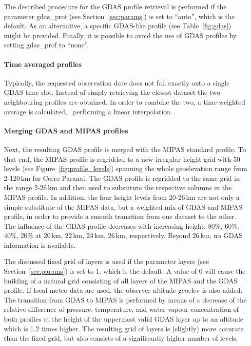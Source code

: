 The described procedure for the \ac{GDAS} profile retrieval is performed if
the parameter {\sc gdas\_prof} (see Section~\ref{sec:params}) is set to
``auto'', which is the default. As an alternative, a specific GDAS-like
profile (see Table~\ref{fig:gdas}) might be provided. Finally, it is possible
to avoid the use of GDAS profiles by setting {\sc gdas\_prof} to ``none''.

\paragraph*{Time averaged profiles}
\label{sec:time_average}
Typically, the requested observation date does not fall exactly onto a single
\ac{GDAS} time slot. Instead of simply retrieving the closest dataset the two
neighbouring profiles are obtained. In order to combine the two, a
time-weighted average is calculated, \ie\ performing a linear interpolation.

\paragraph*{Merging GDAS and MIPAS profiles}
\label{sec:gdas_mipas_merging}
Next, the resulting \ac{GDAS} profile is merged with the MIPAS standard
profile. To that end, the MIPAS profile is regridded to a new irregular height
grid with 50 levels (see Figure~\ref{fig:profile_levels}) spanning the whole
geoelevation range from 2-120\,km for Cerro Paranal. The \ac{GDAS} profile is
regridded to the same grid in the range 2-26\,km and then used to substitute
the respective columns in the MIPAS profile. In addition, the four height
levels from 20-26\,km are not only a simple substitute of the MIPAS data, but a
weighted mix of \ac{GDAS} and MIPAS profile, in order to provide a smooth
transition from one dataset to the other. The influence of the \ac{GDAS}
profile decreases with increasing height: 80\%, 60\%, 40\%, 20\% at 20\,km,
22\,km, 24\,km, 26\,km, respectively. Beyond 26\,km, no \ac{GDAS} information
is available.

The discussed fixed grid of layers is used if the parameter {\sc layers}
(see Section~\ref{sec:params}) is set to 1, which is the default. A value of
0 will cause the building of a natural grid consisting of all layers of the
MIPAS and the \ac{GDAS} profile. If local meteo data are used, the observer
altitude {\sc geoelev} is also added. The transition from \ac{GDAS} to MIPAS
is performed by means of a decrease of the relative difference of pressure,
temperature, and water vapour concentration of both profiles at the height of
the uppermost valid GDAS layer up to an altitude which is 1.2 times higher.
The resulting grid of layers is (slightly) more accurate than the fixed grid,
but also consists of a significantly higher number of levels.

